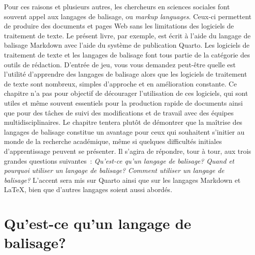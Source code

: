\documentclass[
  letterpaper,
  DIV=11,
  numbers=noendperiod]{scrreprt}
\begin{document}
Pour ces raisons et plusieurs autres, les chercheurs en sciences
sociales font souvent appel aux langages de balisage, ou \emph{markup
languages}. Ceux-ci permettent de produire des documents et pages Web
sans les limitations des logiciels de traitement de texte. Le présent
livre, par exemple, est écrit à l'aide du langage de balisage Markdown
avec l'aide du système de publication Quarto. Les logiciels de
traitement de texte et les langages de balisage font tous partie de la
catégorie des outils de rédaction. D'entrée de jeu, vous vous demandez
peut-être quelle est l'utilité d'apprendre des langages de balisage
alors que les logiciels de traitement de texte sont nombreux, simples
d'approche et en amélioration constante. Ce chapitre n'a pas pour
objectif de décourager l'utilisation de ces logiciels, qui sont utiles
et même souvent essentiels pour la production rapide de documents ainsi
que pour des tâches de suivi des modifications et de travail avec des
équipes multidisciplinaires. Le chapitre tentera plutôt de démontrer que
la maîtrise des langages de balisage constitue un avantage pour ceux qui
souhaitent s'initier au monde de la recherche académique, même si
quelques difficultés initiales d'apprentissage peuvent se présenter. Il
s'agira de répondre, tour à tour, aux trois grandes questions
suivantes~: \emph{Qu'est-ce qu'un langage de balisage? Quand et pourquoi
utiliser un langage de balisage? Comment utiliser un langage de
balisage?} L'accent sera mis sur Quarto ainsi que sur les langages
Markdown et LaTeX, bien que d'autres langages soient aussi abordés.

\section{Qu'est-ce qu'un langage de
balisage?}\label{quest-ce-quun-langage-de-balisage}
\end{document}
